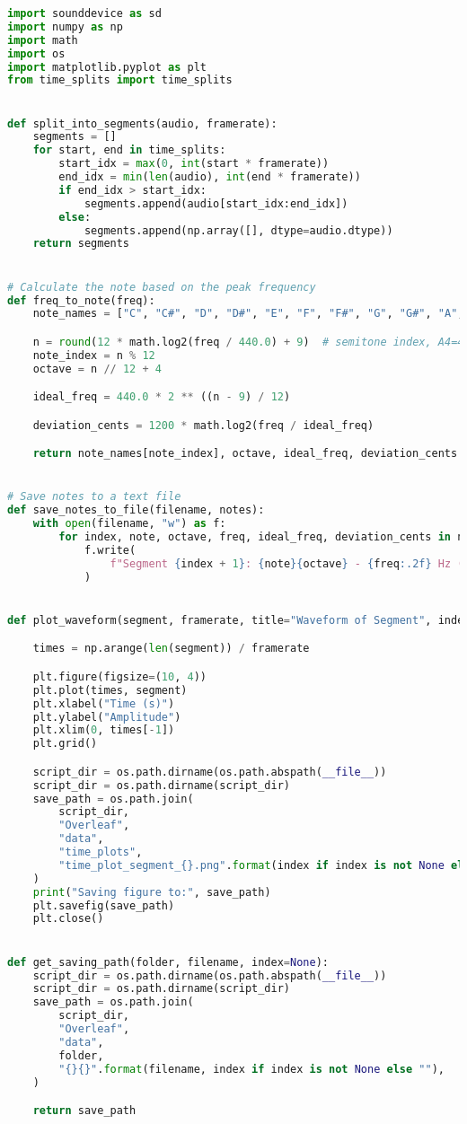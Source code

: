 \begin{lstlisting}[language=Python, caption={\texttt{helper\_functions.py}}, label={lst:helper_functions}]
import sounddevice as sd
import numpy as np
import math
import os
import matplotlib.pyplot as plt
from time_splits import time_splits


def split_into_segments(audio, framerate):
    segments = []
    for start, end in time_splits:
        start_idx = max(0, int(start * framerate))
        end_idx = min(len(audio), int(end * framerate))
        if end_idx > start_idx:
            segments.append(audio[start_idx:end_idx])
        else:
            segments.append(np.array([], dtype=audio.dtype))
    return segments


# Calculate the note based on the peak frequency
def freq_to_note(freq):
    note_names = ["C", "C#", "D", "D#", "E", "F", "F#", "G", "G#", "A", "A#", "B"]

    n = round(12 * math.log2(freq / 440.0) + 9)  # semitone index, A4=440 -> n=9
    note_index = n % 12
    octave = n // 12 + 4

    ideal_freq = 440.0 * 2 ** ((n - 9) / 12)

    deviation_cents = 1200 * math.log2(freq / ideal_freq)

    return note_names[note_index], octave, ideal_freq, deviation_cents


# Save notes to a text file
def save_notes_to_file(filename, notes):
    with open(filename, "w") as f:
        for index, note, octave, freq, ideal_freq, deviation_cents in notes:
            f.write(
                f"Segment {index + 1}: {note}{octave} - {freq:.2f} Hz (Ideal: {ideal_freq:.2f} Hz, Deviation: {deviation_cents:.2f} cents)\n"
            )


def plot_waveform(segment, framerate, title="Waveform of Segment", index=None):

    times = np.arange(len(segment)) / framerate

    plt.figure(figsize=(10, 4))
    plt.plot(times, segment)
    plt.xlabel("Time (s)")
    plt.ylabel("Amplitude")
    plt.xlim(0, times[-1])
    plt.grid()

    script_dir = os.path.dirname(os.path.abspath(__file__))
    script_dir = os.path.dirname(script_dir)
    save_path = os.path.join(
        script_dir,
        "Overleaf",
        "data",
        "time_plots",
        "time_plot_segment_{}.png".format(index if index is not None else "unknown"),
    )
    print("Saving figure to:", save_path)
    plt.savefig(save_path)
    plt.close()


def get_saving_path(folder, filename, index=None):
    script_dir = os.path.dirname(os.path.abspath(__file__))
    script_dir = os.path.dirname(script_dir)
    save_path = os.path.join(
        script_dir,
        "Overleaf",
        "data",
        folder,
        "{}{}".format(filename, index if index is not None else ""),
    )

    return save_path

    \end{lstlisting}